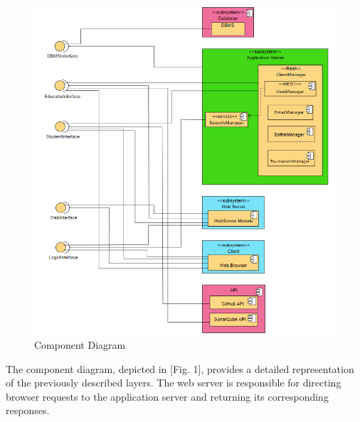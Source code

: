 \documentclass[12pt,oneside,a4paper]{article}
\begin{document}
\begin{figure}[htbp]
    \centering
    \includegraphics[width=1\linewidth]{Images/Diagrams/ComponentDiagram.png}
    \caption{Component Diagram}
    \label{fig:enter-label}
\end{figure}

\pagebreak

\begin{flushleft}The component diagram, depicted in [Fig. 1], provides a detailed representation of the previously described layers. The web server is responsible for directing browser requests to the application server and returning its corresponding responses.
\end{flushleft}
\end{document}
